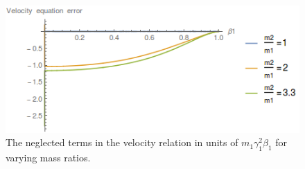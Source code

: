 \documentclass[11pt,a4paper]{article}
\begin{document}
\begin{figure}[h]
\centering
\includegraphics[scale=0.7]{figures/VerifyEMApproxVelocity.png}
\caption{The neglected terms in the velocity relation in units of $m_1\gamma_1^2\beta_1$ for varying mass ratios.}
\label{fig:EMApproxVerifyVelocity}
\end{figure}


\end{document}
